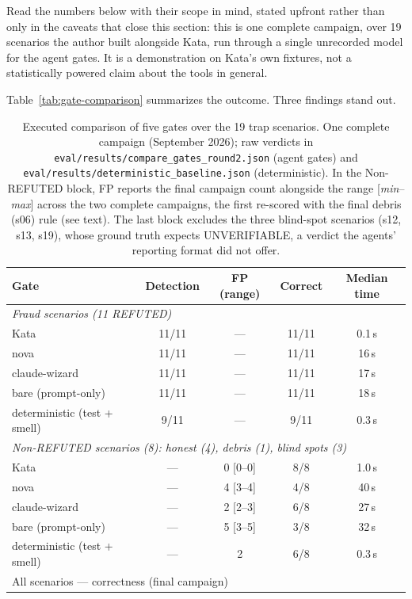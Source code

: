 \documentclass[11pt]{article}
\begin{document}
Read the numbers below with their scope in mind, stated upfront rather than only
in the caveats that close this section: this is one complete campaign, over
19 scenarios the author built alongside Kata, run through a single
unrecorded model for the agent gates. It is a demonstration on Kata's own
fixtures, not a statistically powered claim about the tools in general.

Table~\ref{tab:gate-comparison} summarizes the outcome. Three findings
stand out.

\begin{table}[!ht]
\caption{Executed comparison of five gates over the 19 trap scenarios.
One complete campaign (September 2026); raw verdicts in
\texttt{eval/results/compare\_gates\_round2.json} (agent gates) and
\texttt{eval/results/deterministic\_baseline.json} (deterministic).
In the Non-REFUTED
block, FP reports the final campaign count alongside the range
[\emph{min}--\emph{max}] across the two complete campaigns, the first
re-scored with the final debris (s06) rule (see text). The last block excludes the three blind-spot scenarios
(s12, s13, s19), whose ground truth expects UNVERIFIABLE, a verdict the
agents' reporting format did not offer.}
\centering
\footnotesize
\begin{tabular}{@{}lcccc@{}}
\toprule
Gate & Detection & FP (range) & Correct & Median time \\
\midrule
\multicolumn{5}{l}{\emph{Fraud scenarios (11 REFUTED)}} \\
Kata & 11/11 & --- & 11/11 & 0.1\,s \\
nova & 11/11 & --- & 11/11 & 16\,s \\
claude-wizard & 11/11 & --- & 11/11 & 17\,s \\
bare (prompt-only) & 11/11 & --- & 11/11 & 18\,s \\
deterministic (test + smell) & 9/11 & --- & 9/11 & 0.3\,s \\
\multicolumn{5}{l}{\emph{Non-REFUTED scenarios (8): honest (4), debris (1), blind spots (3)}} \\
Kata & --- & 0 [0--0] & 8/8 & 1.0\,s \\
nova & --- & 4 [3--4] & 4/8 & 40\,s \\
claude-wizard & --- & 2 [2--3] & 6/8 & 27\,s \\
bare (prompt-only) & --- & 5 [3--5] & 3/8 & 32\,s \\
deterministic (test + smell) & --- & 2 & 6/8 & 0.3\,s \\
\midrule
\multicolumn{5}{l}{All scenarios --- correctness (final campaign)} \\

\end{tabular}
\end{table}
\end{document}
